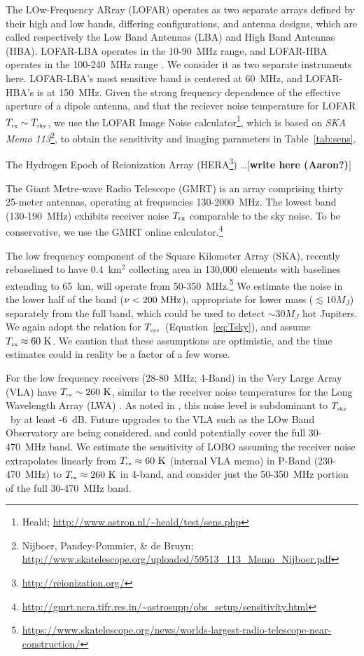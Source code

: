 \documentclass[iop,numberedappendix,apj]{emulateapj}
\def\memoYF#1{\color{red}$[${\bf #1}$]$ \color{black}}
\newcommand{\Tsky}{\mbox{$T_{\mbox{\tiny sky}}$}}
\newcommand{\Tsys}{\mbox{$T_{\mbox{\tiny sys}}$}}
\newcommand{\Trx}{\mbox{$T_{\mbox{\tiny rx}}$}}
\begin{document}
The LOw-Frequency ARray (LOFAR) operates as two separate arrays defined by their high and low bands, differing configurations, and antenna designs, which are called respectively the Low Band Antennas (LBA) and High Band Antennas (HBA).
LOFAR-LBA operates in the 10-90~MHz range, and LOFAR-HBA operates in the 100-240~MHz range \citep{vanHaarlem2013}.
We consider it as two separate instruments here.
LOFAR-LBA's most sensitive band is centered at 60~MHz, and LOFAR-HBA's is at 150~MHz.
Given the strong frequency dependence of the effective aperture of a dipole antenna, and that the reciever noise temperature for LOFAR $\Trx \sim \Tsky$, we use the LOFAR Image Noise calculator\footnote{Heald; \url{http://www.astron.nl/~heald/test/sens.php}}, which is based on {\it SKA Memo 113}\footnote{Nijboer, Pandey-Pommier, \& de Bruyn; \url{http://www.skatelescope.org/uploaded/59513\_113\_Memo\_Nijboer.pdf}}, to obtain the sensitivity and imaging parameters in Table~\ref{tab:sens}.

The Hydrogen Epoch of Reionization Array (HERA\footnote{\url{http://reionization.org/}}) \ldots \memoYF{write here (Aaron?)}

The Giant Metre-wave Radio Telescope (GMRT) is an array comprising thirty 25-meter antennas, operating at frequencies 130-2000~MHz.
The lowest band (130-190~MHz) exhibits receiver noise $T_{\rm rx}$ comparable to the sky noise.
To be conservative, we use the GMRT online calculator.\footnote{\url{http://gmrt.ncra.tifr.res.in/~astrosupp/obs\_setup/sensitivity.html}}


The low frequency component of the Square Kilometer Array (SKA), recently rebaselined to have 0.4~km$^2$ collecting area in 130,000 elements with baselines extending to 65~km, will operate from 50-350~MHz.\footnote{\url{https://www.skatelescope.org/news/worlds-largest-radio-telescope-near-construction/}}
We estimate the noise in the lower half of the band ($\nu<200~\rm MHz$), appropriate for lower mass ($\lesssim 10 M_J$) separately from the full band, which could be used to detect $\sim 30 M_J$ hot Jupiters.
We again adopt the \cite{Rogers+Bowman2008} relation for \Tsys\ (Equation~\ref{eq:Tsky}), and assume $\Trx \approx 60~\rm K$.
We caution that these assumptions are optimistic, and the time estimates could in reality be a factor of a few worse.

For the low frequency receivers (28-80~MHz; 4-Band) in the Very Large Array (VLA) have $\Trx \sim 260~\rm K$, similar to the receiver noise temperatures for the Long Wavelength Array (LWA) \citep{Hicks2012}.  As noted in \citep{Hicks2012}, this noise level is subdominant to \Tsky\ by at least -6~dB.
Future upgrades to the VLA such as the LOw Band Observatory \citep[LOBO][]{Kassim2015IAU} are being considered, and could potentially cover the full 30-470~MHz band.
We estimate the sensitivity of LOBO assuming the receiver noise extrapolates linearly from $\Trx \approx 60~\rm K$ (internal VLA memo) in P-Band (230-470~MHz) to $\Trx \approx 260~\rm K$ in 4-band, and consider just the 50-350~MHz portion of the full 30-470~MHz band.
\end{document}

